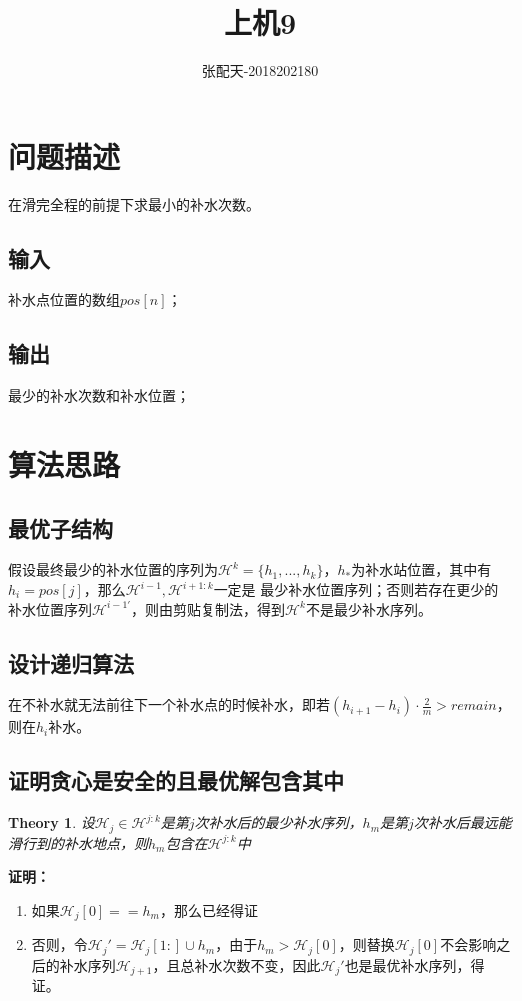 \documentclass{ctexart}[UTF8]
\title{上机9}
\author{张配天-2018202180}
\newtheorem{theorem}{Theory}[section]
\begin{document}
    \maketitle
    \tableofcontents
    \clearpage
    \section{问题描述}
    在滑完全程的前提下求最小的补水次数。
    \subsection{输入}
    补水点位置的数组$pos[n]$；
    \subsection{输出}
    最少的补水次数和补水位置；
    \section{算法思路}
    \subsection{最优子结构}
    假设最终最少的补水位置的序列为$\mathcal{H}^k = \{h_1,...,h_k\}$，$h_{*}$为补水站位置，其中有$h_i = pos[j]$，那么$\mathcal{H}^{i-1},\mathcal{H}^{i+1:k}$一定是
    最少补水位置序列；否则若存在更少的补水位置序列$\mathcal{H}^{i-1'}$，则由剪贴复制法，得到$\mathcal{H}^k$不是最少补水序列。
    \subsection{设计递归算法}
    在不补水就无法前往下一个补水点的时候补水，即若$(h_{i+1}-h_i)\cdot \frac{2}{m} > remain$，则在$h_i$补水。
    \subsection{证明贪心是安全的且最优解包含其中}
    \begin{theorem}
        设$\mathcal{H}_j \in \mathcal{H}^{j:k}$是第$j$次补水后的最少补水序列，$h_m$是第$j$次补水后最远能滑行到的补水地点，则$h_m$包含在$\mathcal{H}^{j:k}$中
    \end{theorem}
    \noindent\textbf{证明：}
    \begin{enumerate}
            \item 如果$\mathcal{H}_j[0] == h_m$，那么已经得证
            \item 否则，令$\mathcal{H}_j' = \mathcal{H}_j[1:] \cup h_m$，由于$h_m > \mathcal{H}_j[0]$，则替换$\mathcal{H}_j[0]$不会影响之后的补水序列$\mathcal{H}_{j+1}$，且总补水次数不变，因此$\mathcal{H}_j'$也是最优补水序列，得证。
        \end{enumerate}
\end{document}
